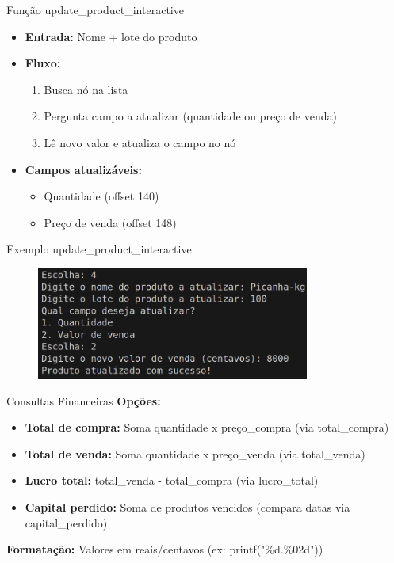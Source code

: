 \documentclass{beamer}
\begin{document}
\begin{frame}{Função update\_product\_interactive}
    \begin{itemize}
        \item \textbf{Entrada:} Nome + lote do produto
        \item \textbf{Fluxo:}
        \begin{enumerate}
            \item Busca nó na lista
            \item Pergunta campo a atualizar (quantidade ou preço de venda)
            \item Lê novo valor e atualiza o campo no nó
        \end{enumerate}
        \item \textbf{Campos atualizáveis:}
        \begin{itemize}
            \item Quantidade (offset 140)
            \item Preço de venda (offset 148)
        \end{itemize}
    \end{itemize}
\end{frame}

\begin{frame}{Exemplo update\_product\_interactive}
    \begin{figure}
        \centering
        \includegraphics[width=0.8\textwidth]{img/update.png}
    \end{figure}
\end{frame}

\begin{frame}{Consultas Financeiras}
    \textbf{Opções:}
    \begin{itemize}
        \item \textbf{Total de compra:} Soma quantidade x preço\_compra (via total\_compra)
        \item \textbf{Total de venda:} Soma quantidade x preço\_venda (via total\_venda)
        \item \textbf{Lucro total:} total\_venda - total\_compra (via lucro\_total)
        \item \textbf{Capital perdido:} Soma de produtos vencidos (compara datas via capital\_perdido)
    \end{itemize}
    \vspace{0.5cm}
    \textbf{Formatação:} Valores em reais/centavos (ex: printf("\%d.\%02d"))
\end{frame}
\end{document}
